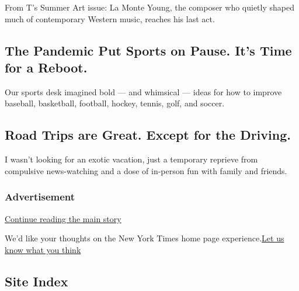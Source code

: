 From T's Summer Art issue: La Monte Young, the composer who quietly
shaped much of contemporary Western music, reaches his last act.

\href{/interactive/2020/07/21/sports/coronavirus-changes-baseball-nba-nfl.html}{}

\hypertarget{the-pandemic-put-sports-on-pause-its-time-for-a-reboot}{%
\subsection{The Pandemic Put Sports on Pause. It's Time for a
Reboot.}\label{the-pandemic-put-sports-on-pause-its-time-for-a-reboot}}

Our sports desk imagined bold --- and whimsical --- ideas for how to
improve baseball, basketball, football, hockey, tennis, golf, and
soccer.

\href{/interactive/2020/07/21/sports/coronavirus-changes-baseball-nba-nfl.html}{}

\href{/2020/07/24/travel/virus-road-trip.html}{}

\hypertarget{road-trips-are-great-except-for-the-driving}{%
\subsection{Road Trips are Great. Except for the
Driving.}\label{road-trips-are-great-except-for-the-driving}}

I wasn't looking for an exotic vacation, just a temporary reprieve from
compulsive news-watching and a dose of in-person fun with family and
friends.

\href{/2020/07/24/travel/virus-road-trip.html}{}

\hypertarget{advertisement}{%
\subsubsection{Advertisement}\label{advertisement}}

\protect\hyperlink{after-dfp-ad-mid1-large}{Continue reading the main
story}

We'd like your thoughts on the New York Times home page
experience.\href{http://nyt.qualtrics.com/jfe/form/SV_eFJmKj9v0krSE0l}{Let
us know what you think}

\hypertarget{site-index}{%
\subsection{Site Index}\label{site-index}}

